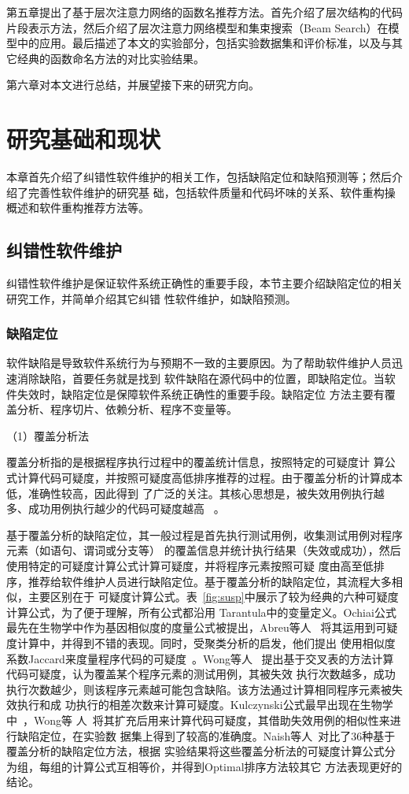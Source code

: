 第五章提出了基于层次注意力网络的函数名推荐方法。首先介绍了层次结构的代码片段表示方法，然后介绍了层次注意力网络模型和集束搜索（Beam Search）在模型中的应用。最后描述了本文的实验部分，包括实验数据集和评价标准，以及与其它经典的函数命名方法的对比实验结果。

第六章对本文进行总结，并展望接下来的研究方向。

\chapter{研究基础和现状}
本章首先介绍了纠错性软件维护的相关工作，包括缺陷定位和缺陷预测等；然后介绍了完善性软件维护的研究基
础，包括软件质量和代码坏味的关系、软件重构操概述和软件重构推荐方法等。
\section{纠错性软件维护}
纠错性软件维护是保证软件系统正确性的重要手段，本节主要介绍缺陷定位的相关研究工作，并简单介绍其它纠错
性软件维护，如缺陷预测。
\subsection{缺陷定位}
软件缺陷是导致软件系统行为与预期不一致的主要原因。为了帮助软件维护人员迅速消除缺陷，首要任务就是找到
软件缺陷在源代码中的位置，即缺陷定位。当软件失效时，缺陷定位是保障软件系统正确性的重要手段。缺陷定位
方法主要有覆盖分析、程序切片、依赖分析、程序不变量等。

（1）覆盖分析法

覆盖分析指的是根据程序执行过程中的覆盖统计信息，按照特定的可疑度计
算公式计算代码可疑度，并按照可疑度高低排序推荐的过程。由于覆盖分析的计算成本低，准确性较高，因此得到
了广泛的关注。其核心思想是，被失效用例执行越多、成功用例执行越少的代码可疑度越高
~\cite{jones2005empirical}。

基于覆盖分析的缺陷定位，其一般过程是首先执行测试用例，收集测试用例对程序元素（如语句、谓词或分支等）
的覆盖信息并统计执行结果（失效或成功），然后使用特定的可疑度计算公式计算可疑度，并将程序元素按照可疑
度由高至低排序，推荐给软件维护人员进行缺陷定位。基于覆盖分析的缺陷定位，其流程大多相似，主要区别在于
可疑度计算公式。表~\ref{fig:susp}中展示了较为经典的六种可疑度计算公式，为了便于理解，所有公式都沿用
Tarantula中的变量定义。Ochiai公式最先在生物学中作为基因相似度的度量公式被提出，Abreu等人
~\cite{abreu2007accuracy}将其运用到可疑度计算中，并得到不错的表现。同时，受聚类分析的启发，他们提出
使用相似度系数Jaccard来度量程序代码的可疑度~\cite{abreu2007accuracy}。Wong等人
~\cite{wong2008crosstab}提出基于交叉表的方法计算代码可疑度，认为覆盖某个程序元素的测试用例，其被失效
执行次数越多，成功执行次数越少，则该程序元素越可能包含缺陷。该方法通过计算相同程序元素被失效执行和成
功执行的相差次数来计算可疑度。Kulczynski公式最早出现在生物学中~\cite{willett2003similarity}，Wong等
人~\cite{wong2014dstar}将其扩充后用来计算代码可疑度，其借助失效用例的相似性来进行缺陷定位，在实验数
据集上得到了较高的准确度。Naish等人~\cite{naish2011model}对比了36种基于覆盖分析的缺陷定位方法，根据
实验结果将这些覆盖分析法的可疑度计算公式分为组，每组的计算公式互相等价，并得到Optimal排序方法较其它
方法表现更好的结论。


